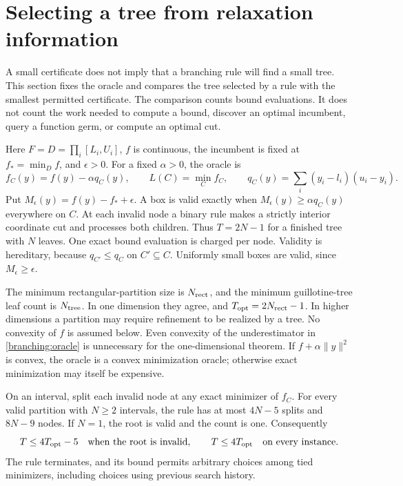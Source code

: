 \section{Selecting a tree from relaxation information}
\label{sec:branching}

A small certificate does not imply that a branching rule will find a small
tree. This section fixes the oracle and compares the tree selected by a
rule with the smallest permitted certificate. The comparison counts bound
evaluations. It does not count the work needed to compute a bound, discover
an optimal incumbent, query a function germ, or compute an optimal cut.

Here $F=D=\prod_i[L_i,U_i]$, $f$ is continuous, the incumbent is fixed at
$f_* =\min_Df$, and $\epsilon>0$. For a fixed $\alpha>0$, the oracle is
\begin{equation}
 f_C(y)=f(y)-\alpha q_C(y),\qquad L(C)=\min_Cf_C,
 \qquad q_C(y)=\sum_i(y_i-l_i)(u_i-y_i).
 \label{branching:oracle}
\end{equation}
Put $M_\epsilon(y)=f(y)-f_*+\epsilon$. A box is valid exactly when
$M_\epsilon(y)\ge\alpha q_C(y)$ everywhere on $C$. At each invalid
node a binary rule makes a strictly interior coordinate cut and processes
both children. Thus $T=2N-1$ for a finished tree with $N$ leaves.
One exact bound evaluation is charged per node. Validity is hereditary,
because $q_{C'}\le q_C$ on $C'\subseteq C$. Uniformly small boxes are
valid, since $M_\epsilon\ge\epsilon$.

The minimum rectangular-partition size is $N_{\rm rect}$, and the minimum
guillotine-tree leaf count is $N_{\rm tree}$. In one dimension they agree,
and $T_{\rm opt}=2N_{\rm rect}-1$. In higher dimensions a partition may
require refinement to be realized by a tree. No convexity of $f$ is
assumed below. Even convexity of the underestimator in
\eqref{branching:oracle} is unnecessary for the one-dimensional theorem.
If $f+\alpha\|y\|^2$ is convex, the oracle is a convex minimization
oracle; otherwise exact minimization may itself be expensive.

\begin{theorem}
\label{branching:four-competitive}
On an interval, split each invalid node at any exact minimizer of
$f_C$. For every valid partition with $N\ge2$ intervals, the rule has
at most $4N-5$ splits and $8N-9$ nodes. If $N=1$, the root is valid
and the count is one. Consequently
\[
 T\le4T_{\rm opt}-5\quad\text{when the root is invalid},
 \qquad T\le4T_{\rm opt}\quad\text{on every instance}.
\]
The rule terminates, and its bound permits arbitrary choices among tied
minimizers, including choices using previous search history.
\end{theorem}

